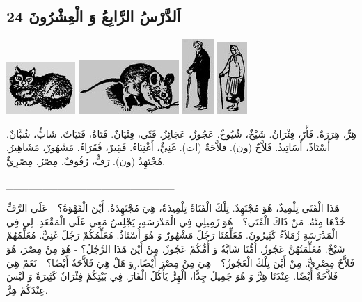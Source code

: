 \documentclass[a5paper]{article}
\begin{document}
\subsection{24 اَلدَّرْسُ الرَّابِعُ وَ الْعِشْرُونَ}
 \includegraphics[width=1.0311in,height=0.7811in]{images/MuhammadBagauddinprettified-img041.jpg}   \includegraphics[width=1.5in,height=0.8126in]{images/MuhammadBagauddinprettified-img042.jpg}   \includegraphics[width=0.4791in,height=1.1252in]{images/MuhammadBagauddinprettified-img043.jpg}   \includegraphics[width=0.448in,height=1.0728in]{images/MuhammadBagauddinprettified-img044.jpg} 

هِرٌّ، هِرَرَةٌ. فَأْرٌ، فِئْرَانٌ. شَيْخٌ، شُيُوخٌ. عَجُوزٌ، عَجَائِزُ. فَتًى، فِتْيَانٌ. فَتَاةٌ، فَتَيَاتٌ. شَابٌّ، شُبَّانٌ. أُسْتَاذٌ، أَسَاتِيذُ. فَلاَّحٌ (ون). فلاَّحَةٌ (ات). غَنِيٌّ، أَغْنِيَاءُ. فَقِيرٌ، فُقَرَاءُ. مَشْهُورٌ، مَشَاهِيرُ. مُجْتَهِدٌ (ون). رَفٌّ، رُفُوفٌ. مِصْرُ. مِصْرِيٌّ.

\_\_\_\_\_\_\_\_\_\_\_\_\_\_\_\_\_\_\_\_\_\_\_

هَذَا الْفَتَى تِلْمِيذٌ، هُوَ مُجْتَهِدٌ. تِلْكَ الْفَتَاةُ تِلْمِيذَةٌ، هِيَ مُجْتَهِدَةٌ. أَيْنَ الْقَهْوَةُ؟ - عَلَى الرَّفِّ خُذْهَا مِنْهُ. مَنْ ذَاكَ الْفَتَى؟ - هُوَ زَمِيلِي فِي الْمَدْرَسَةِ، يَجْلِسُ مَعِي عَلَى الْمَقْعَدِ. لِي فِي الْمَدْرَسَةِ زُمَلاَءُ كَثِيرُونَ. مُعَلِّمُنَا رَجُلٌ مَشْهُورٌ وَ هُوَ أُسْتَاذٌ. مُعَلِّمُكُمْ رَجُلٌ غَنِيٌّ. مُعَلِّمُهُمْ شَيْخٌ. مُعَلِّمَتُهُنَّ عَجُوزٌ. أُمُّنَا شَابَّةٌ وَ أُمُّكُمْ عَجُوزٌ. مِنْ أَيْنَ هَذَا الرَّجُلُ؟ - هُوَ مِنْ مِصْرَ، هُوَ فَلاَّحٌ مِصْرِيٌّ. مِنْ أَيْنَ تِلْكَ الْعَجُوزُ؟ - هِيَ مِنْ مِصْرَ أَيْضًا. وَ هَلْ هِيَ فَلاَّحَةٌ أَيْضًا؟ - نَعَمْ هِيَ فَلاَّحَةٌ أَيْضًا. عِنْدَنَا هِرٌّ وَ هُوَ جَمِيلٌ جِدًّا، اَلْهِرُّ يَأْكُلُ الْفَأْرَ. فِي بَيْتِكُمْ فِئْرَانٌ كَثِيرَةٌ وَ لَيْسَ عِنْدَكُمْ هِرٌّ.
\end{document}
